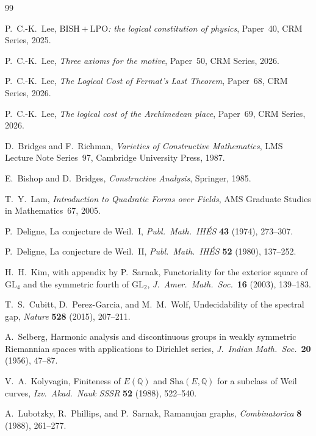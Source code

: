 \documentclass[11pt]{article}
\theoremstyle{definition}
\theoremstyle{remark}
\newcommand{\Q}{\mathbb{Q}}
\newcommand{\GL}{\mathrm{GL}}
\newcommand{\BISH}{\mathrm{BISH}}
\newcommand{\LPO}{\mathrm{LPO}}
\begin{document}
\begin{thebibliography}{99}

P.~C.-K.~Lee, \emph{$\BISH + \LPO$: the logical constitution of physics},
Paper~40, CRM Series, 2025.

P.~C.-K.~Lee, \emph{Three axioms for the motive},
Paper~50, CRM Series, 2026.

P.~C.-K.~Lee, \emph{The Logical Cost of Fermat's Last Theorem},
Paper~68, CRM Series, 2026.

P.~C.-K.~Lee, \emph{The logical cost of the Archimedean place},
Paper~69, CRM Series, 2026.

D.~Bridges and F.~Richman,
\emph{Varieties of Constructive Mathematics},
LMS Lecture Note Series~97, Cambridge University Press, 1987.

E.~Bishop and D.~Bridges,
\emph{Constructive Analysis},
Springer, 1985.

T.~Y.~Lam,
\emph{Introduction to Quadratic Forms over Fields},
AMS Graduate Studies in Mathematics~67, 2005.

P.~Deligne,
La conjecture de Weil.~I,
\emph{Publ.\ Math.\ IH\'ES} \textbf{43} (1974), 273--307.

P.~Deligne,
La conjecture de Weil.~II,
\emph{Publ.\ Math.\ IH\'ES} \textbf{52} (1980), 137--252.

H.~H.~Kim, with appendix by P.~Sarnak,
Functoriality for the exterior square of $\GL_4$ and the symmetric fourth of $\GL_2$,
\emph{J.\ Amer.\ Math.\ Soc.}\ \textbf{16} (2003), 139--183.

T.~S.~Cubitt, D.~Perez-Garcia, and M.~M.~Wolf,
Undecidability of the spectral gap,
\emph{Nature} \textbf{528} (2015), 207--211.

A.~Selberg,
Harmonic analysis and discontinuous groups in weakly symmetric Riemannian spaces with applications to Dirichlet series,
\emph{J.\ Indian Math.\ Soc.}\ \textbf{20} (1956), 47--87.

V.~A.~Kolyvagin,
Finiteness of $E(\Q)$ and $\text{Sha}(E, \Q)$ for a subclass of Weil curves,
\emph{Izv.\ Akad.\ Nauk SSSR} \textbf{52} (1988), 522--540.

A.~Lubotzky, R.~Phillips, and P.~Sarnak,
Ramanujan graphs,
\emph{Combinatorica} \textbf{8} (1988), 261--277.


\end{thebibliography}
\end{document}
